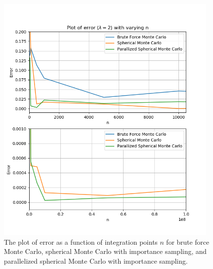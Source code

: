 \documentclass{article}
\begin{document}
  \begin{figure}[ht]
    \centering
    \includegraphics[width = 11cm]{images/error-montecarlo.png}
    \caption{The plot of error as a function of integration points $n$ for brute force Monte Carlo, spherical Monte Carlo with importance sampling, and parallelized spherical Monte Carlo with importance sampling. }
    \label{fig:montecarlopng}
  \end{figure}
\end{document}
